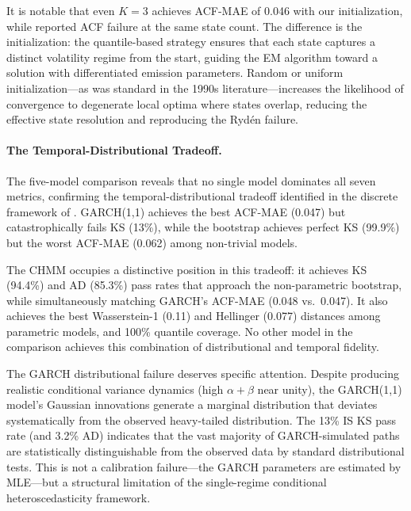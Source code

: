 It is notable that even $K = 3$ achieves ACF-MAE of 0.046 with our initialization, while \citet{ryden1998stylized} reported ACF failure at the same state count.
The difference is the initialization: the quantile-based strategy ensures that each state captures a distinct volatility regime from the start, guiding the EM algorithm toward a solution with differentiated emission parameters.
Random or uniform initialization---as was standard in the 1990s literature---increases the likelihood of convergence to degenerate local optima where states overlap, reducing the effective state resolution and reproducing the Ryd\'{e}n failure.

\paragraph{The Temporal-Distributional Tradeoff.}
The five-model comparison reveals that no single model dominates all seven metrics, confirming the temporal-distributional tradeoff identified in the discrete framework of \citet{alswaidan2026hybrid}.
GARCH(1,1) achieves the best ACF-MAE (0.047) but catastrophically fails KS (13\%), while the bootstrap achieves perfect KS (99.9\%) but the worst ACF-MAE (0.062) among non-trivial models.

The CHMM occupies a distinctive position in this tradeoff: it achieves KS (94.4\%) and AD (85.3\%) pass rates that approach the non-parametric bootstrap, while simultaneously matching GARCH's ACF-MAE (0.048 vs.\ 0.047).
It also achieves the best Wasserstein-1 (0.11) and Hellinger (0.077) distances among parametric models, and 100\% quantile coverage.
No other model in the comparison achieves this combination of distributional and temporal fidelity.

The GARCH distributional failure deserves specific attention.
Despite producing realistic conditional variance dynamics (high $\alpha + \beta$ near unity), the GARCH(1,1) model's Gaussian innovations generate a marginal distribution that deviates systematically from the observed heavy-tailed distribution.
The 13\% IS KS pass rate (and 3.2\% AD) indicates that the vast majority of GARCH-simulated paths are statistically distinguishable from the observed data by standard distributional tests.
This is not a calibration failure---the GARCH parameters are estimated by MLE---but a structural limitation of the single-regime conditional heteroscedasticity framework.


